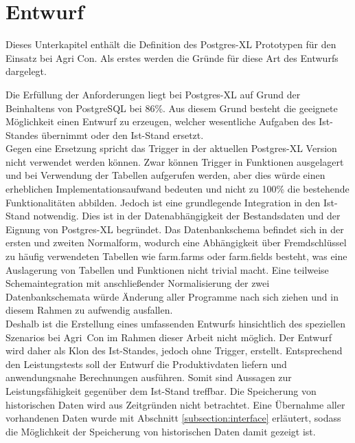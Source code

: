 
\section{Entwurf}
Dieses Unterkapitel enthält die Definition des Postgres-XL Prototypen für den Einsatz bei Agri Con.
Als erstes werden die Gründe für diese Art des Entwurfs dargelegt.

Die Erfüllung der Anforderungen liegt bei Postgres-XL auf Grund der Beinhaltens von PostgreSQL bei 86\%{}.
Aus diesem Grund besteht die geeignete Möglichkeit einen Entwurf zu erzeugen, welcher wesentliche Aufgaben des Ist-Standes übernimmt oder den Ist-Stand ersetzt.\\
Gegen eine Ersetzung spricht das Trigger in der aktuellen Postgres-XL Version nicht verwendet werden können.
Zwar können Trigger in Funktionen ausgelagert und bei Verwendung der Tabellen aufgerufen werden, aber dies würde einen erheblichen Implementationsaufwand bedeuten und nicht zu 100\%{} die bestehende Funktionalitäten abbilden.
Jedoch ist eine grundlegende Integration in den Ist-Stand notwendig. %
Dies ist in der Datenabhängigkeit der Bestandsdaten und der Eignung von Postgres-XL begründet.
Das Datenbankschema befindet sich in der ersten und zweiten Normalform, wodurch eine Abhängigkeit über Fremdschlüssel zu häufig verwendeten Tabellen wie farm.farms oder farm.fields besteht, was eine Auslagerung von Tabellen und Funktionen nicht trivial macht.
Eine teilweise Schemaintegration mit anschließender Normalisierung der zwei Datenbankschemata würde Änderung aller Programme nach sich ziehen und in diesem Rahmen zu aufwendig ausfallen.\\
Deshalb ist die Erstellung eines umfassenden Entwurfs hinsichtlich des speziellen Szenarios bei Agri~Con im Rahmen dieser Arbeit nicht möglich.
Der Entwurf wird daher als Klon des Ist-Standes, jedoch ohne Trigger, erstellt.
Entsprechend den Leistungstests soll der Entwurf die Produktivdaten liefern und anwendungsnahe Berechnungen ausführen.
Somit sind Aussagen zur Leistungsfähigkeit gegenüber dem Ist-Stand treffbar.
Die Speicherung von historischen Daten wird aus Zeitgründen nicht betrachtet.
Eine Übernahme aller vorhandenen Daten wurde mit Abschnitt \ref{subsection:interface} erläutert, sodass die Möglichkeit der Speicherung von historischen Daten damit gezeigt ist.

